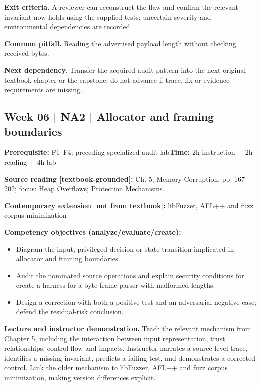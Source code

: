 \documentclass[10pt,letterpaper]{article}
\begin{document}
\textbf{Exit criteria.} A reviewer can reconstruct the flaw and confirm the relevant invariant now holds using the supplied tests; uncertain severity and environmental dependencies are recorded.

\textbf{Common pitfall.} Reading the advertised payload length without checking received bytes.

\textbf{Next dependency.} Transfer the acquired audit pattern into the next original textbook chapter or the capstone; do not advance if trace, fix or evidence requirements are missing.

\subsection{Week 06 | NA2 | Allocator and framing boundaries}
\textbf{Prerequisite:} F1--F4; preceding specialized audit lab\hfill\textbf{Time:} 2h instruction + 2h reading + 4h lab

\textbf{Source reading [textbook-grounded]:} Ch. 5, Memory Corruption, pp. 167--202; focus: Heap Overflows; Protection Mechanisms.

\textbf{Contemporary extension [not from textbook]:} libFuzzer, AFL++ and fuzz corpus minimization

\textbf{Competency objectives (analyze/evaluate/create):}
\begin{itemize}[leftmargin=*,itemsep=2pt]
\item Diagram the input, privileged decision or state transition implicated in allocator and framing boundaries.
\item Audit the nominated source operations and explain security conditions for create a harness for a byte-frame parser with malformed lengths.
\item Design a correction with both a positive test and an adversarial negative case; defend the residual-risk conclusion.
\end{itemize}
\textbf{Lecture and instructor demonstration.} Teach the relevant mechanism from Chapter 5, including the interaction between input representation, trust relationships, control flow and impacts. Instructor narrates a source-level trace, identifies a missing invariant, predicts a failing test, and demonstrates a corrected control. Link the older mechanism to libFuzzer, AFL++ and fuzz corpus minimization, making version differences explicit.
\end{document}
